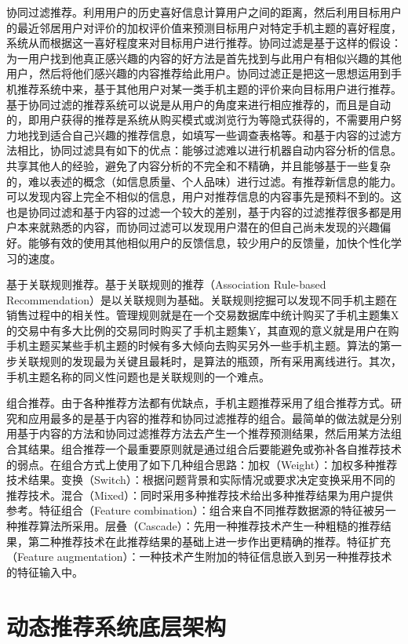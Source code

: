     协同过滤推荐。利用用户的历史喜好信息计算用户之间的距离，然后利用目标用户的最近邻居用户对评价的加权评价值来预测目标用户对特定手机主题的喜好程度，系统从而根据这一喜好程度来对目标用户进行推荐。协同过滤是基于这样的假设：为一用户找到他真正感兴趣的内容的好方法是首先找到与此用户有相似兴趣的其他用户，然后将他们感兴趣的内容推荐给此用户。协同过滤正是把这一思想运用到手机推荐系统中来，基于其他用户对某一类手机主题的评价来向目标用户进行推荐。基于协同过滤的推荐系统可以说是从用户的角度来进行相应推荐的，而且是自动的，即用户获得的推荐是系统从购买模式或浏览行为等隐式获得的，不需要用户努力地找到适合自己兴趣的推荐信息，如填写一些调查表格等。和基于内容的过滤方法相比，协同过滤具有如下的优点：能够过滤难以进行机器自动内容分析的信息。共享其他人的经验，避免了内容分析的不完全和不精确，并且能够基于一些复杂的，难以表述的概念（如信息质量、个人品味）进行过滤。有推荐新信息的能力。可以发现内容上完全不相似的信息，用户对推荐信息的内容事先是预料不到的。这也是协同过滤和基于内容的过滤一个较大的差别，基于内容的过滤推荐很多都是用户本来就熟悉的内容，而协同过滤可以发现用户潜在的但自己尚未发现的兴趣偏好。能够有效的使用其他相似用户的反馈信息，较少用户的反馈量，加快个性化学习的速度。

    基于关联规则推荐。基于关联规则的推荐（Association Rule-based Recommendation）是以关联规则为基础。关联规则挖掘可以发现不同手机主题在销售过程中的相关性。管理规则就是在一个交易数据库中统计购买了手机主题集X的交易中有多大比例的交易同时购买了手机主题集Y，其直观的意义就是用户在购手机主题买某些手机主题的时候有多大倾向去购买另外一些手机主题。算法的第一步关联规则的发现最为关键且最耗时，是算法的瓶颈，所有采用离线进行。其次，手机主题名称的同义性问题也是关联规则的一个难点。

    组合推荐。由于各种推荐方法都有优缺点，手机主题推荐采用了组合推荐方式。研究和应用最多的是基于内容的推荐和协同过滤推荐的组合。最简单的做法就是分别用基于内容的方法和协同过滤推荐方法去产生一个推荐预测结果，然后用某方法组合其结果。组合推荐一个最重要原则就是通过组合后要能避免或弥补各自推荐技术的弱点。在组合方式上使用了如下几种组合思路：加权（Weight）：加权多种推荐技术结果。变换（Switch）：根据问题背景和实际情况或要求决定变换采用不同的推荐技术。混合（Mixed）：同时采用多种推荐技术给出多种推荐结果为用户提供参考。特征组合（Feature combination）：组合来自不同推荐数据源的特征被另一种推荐算法所采用。层叠（Cascade）：先用一种推荐技术产生一种粗糙的推荐结果，第二种推荐技术在此推荐结果的基础上进一步作出更精确的推荐。特征扩充（Feature augmentation）：一种技术产生附加的特征信息嵌入到另一种推荐技术的特征输入中。

  \section{动态推荐系统底层架构}
